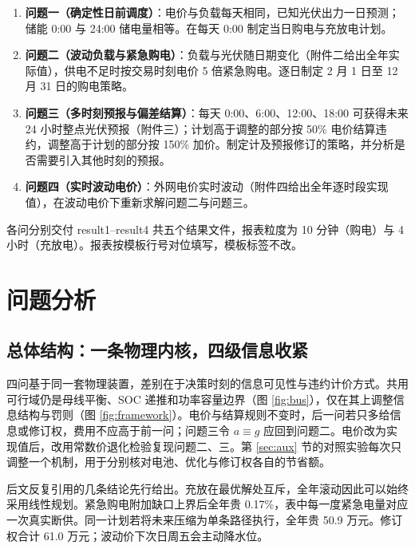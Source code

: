 \documentclass[12pt,a4paper]{ctexart}
\begin{document}
\begin{enumerate}[leftmargin=2em]
  \item \textbf{问题一（确定性日前调度）}：电价与负载每天相同，已知光伏出力一日预测；储能 0:00 与 24:00 储电量相等。在每天 0:00 制定当日购电与充放电计划。
  \item \textbf{问题二（波动负载与紧急购电）}：负载与光伏随日期变化（附件二给出全年实际值），供电不足时按交易时刻电价 5 倍紧急购电。逐日制定 2 月 1 日至 12 月 31 日的购电策略。
  \item \textbf{问题三（多时刻预报与偏差结算）}：每天 0:00、6:00、12:00、18:00 可获得未来 24 小时整点光伏预报（附件三）；计划高于调整的部分按 50\% 电价结算违约，调整高于计划的部分按 150\% 加价。制定计及预报修订的策略，并分析是否需要引入其他时刻的预报。
  \item \textbf{问题四（实时波动电价）}：外网电价实时波动（附件四给出全年逐时段实现值），在波动电价下重新求解问题二与问题三。
\end{enumerate}

各问分别交付 result1--result4 共五个结果文件，报表粒度为 10 分钟（购电）与 4 小时（充放电）。报表按模板行号对位填写，模板标签不改。

\section{问题分析}

\subsection{总体结构：一条物理内核，四级信息收紧}

四问基于同一套物理装置，差别在于决策时刻的信息可见性与违约计价方式。共用可行域仍是母线平衡、SOC 递推和功率容量边界（图 \ref{fig:bus}），仅在其上调整信息结构与罚则（图 \ref{fig:framework}）。电价与结算规则不变时，后一问若只多给信息或修订权，费用不应高于前一问；问题三令 $a\equiv g$ 应回到问题二。电价改为实现值后，改用常数价退化检验复现问题二、三。第 \ref{sec:aux} 节的对照实验每次只调整一个机制，用于分别核对电池、优化与修订权各自的节省额。

后文反复引用的几条结论先行给出。充放在最优解处互斥，全年滚动因此可以始终采用线性规划。紧急购电附加缺口上界后全年贵 0.17\%，表中每一度紧急电量对应一次真实断供。同一计划若将未来压缩为单条路径执行，全年贵 50.9 万元。修订权合计 61.0 万元；波动价下次日周五会主动降水位。
\end{document}
